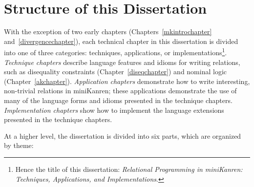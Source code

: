 \section{Structure of this Dissertation}

With the exception of two early chapters
(Chapters~\ref{mkintrochapter} and~\ref{divergencechapter}), each
technical chapter in this dissertation is divided into one of three
categories: techniques, applications, or
implementations\footnote{Hence the title of this dissertation:
  \emph{Relational Programming in miniKanren: Techniques,
    Applications, and Implementations}.}.  \emph{Technique chapters}
describe language features and idioms for writing relations, such as
disequality constraints (Chapter~\ref{diseqchapter}) and nominal logic
(Chapter~\ref{akchapter}).  \emph{Application chapters} demonstrate
how to write interesting, non-trivial relations in miniKanren; these
applications demonstrate the use of many of the language forms and
idioms presented in the technique chapters.  \emph{Implementation
  chapters} show how to implement the language extensions presented in
the technique chapters.

At a higher level, the dissertation is divided into six parts, which
are organized by theme:


